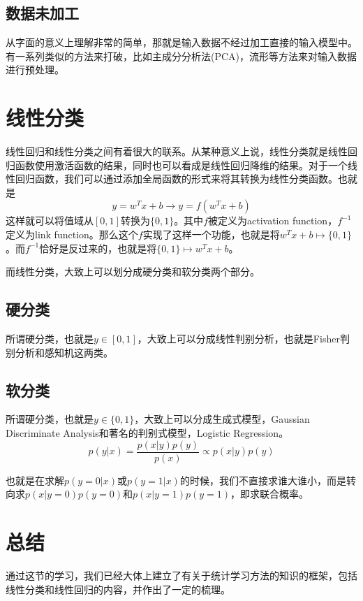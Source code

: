 \documentclass[a4paper]{article}
\begin{document}
\subsection{数据未加工}
从字面的意义上理解非常的简单，那就是输入数据不经过加工直接的输入模型中。有一系列类似的方法来打破，比如主成分分析法(PCA)，流形等方法来对输入数据进行预处理。

\section{线性分类}

线性回归和线性分类之间有着很大的联系。从某种意义上说，线性分类就是线性回归函数使用激活函数的结果，同时也可以看成是线性回归降维的结果。对于一个线性回归函数，我们可以通过添加全局函数的形式来将其转换为线性分类函数。也就是
\begin{equation}
    y=w^Tx+b \longrightarrow y=f(w^Tx+b)
\end{equation}
这样就可以将值域从$[0,1]$转换为$\{0,1\}$。其中$f$被定义为activation function，$f^{-1}$定义为link function。那么这个$f$实现了这样一个功能，也就是将$w^Tx+b \mapsto \{0, 1\}$。而$f^{-1}$恰好是反过来的，也就是将$\{0, 1\} \mapsto w^Tx+b$。

而线性分类，大致上可以划分成硬分类和软分类两个部分。

\subsection{硬分类}
所谓硬分类，也就是$y\in [0,1]$，大致上可以分成线性判别分析，也就是Fisher判别分析和感知机这两类。

\subsection{软分类}
所谓硬分类，也就是$y\in \{0,1\}$，大致上可以分成生成式模型，Gaussian Discriminate Analysis和著名的判别式模型，Logistic Regression。
\begin{equation}
    p(y|x)=\frac{p(x|y)p(y)}{p(x)} \propto p(x|y)p(y)
\end{equation}

也就是在求解$p(y=0|x)$或$p(y=1|x)$的时候，我们不直接求谁大谁小，而是转向求$p(x|y=0)p(y=0)$和$p(x|y=1)p(y=1)$，即求联合概率。

\section{总结}
通过这节的学习，我们已经大体上建立了有关于统计学习方法的知识的框架，包括线性分类和线性回归的内容，并作出了一定的梳理。
\end{document}
